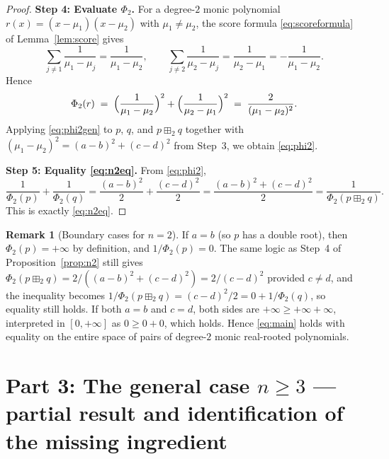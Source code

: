 \documentclass[12pt]{article}
\theoremstyle{definition}
\newtheorem{remark}[theorem]{Remark}
\begin{document}
\begin{proof}
\textbf{Step 4: Evaluate $\Phi_2$.}
For a degree-$2$ monic polynomial $r(x)=(x-\mu_1)(x-\mu_2)$ with $\mu_1\neq\mu_2$, the score formula \eqref{eq:scoreformula} of Lemma~\ref{lem:score} gives
\[
\sum_{j\neq 1}\frac{1}{\mu_1-\mu_j} = \frac{1}{\mu_1-\mu_2},\qquad
\sum_{j\neq 2}\frac{1}{\mu_2-\mu_j} = \frac{1}{\mu_2-\mu_1} = -\frac{1}{\mu_1-\mu_2}.
\]
Hence
\begin{equation}\label{eq:phi2gen}
\Phi_2(r) \;=\; \Bigl(\frac{1}{\mu_1-\mu_2}\Bigr)^2 + \Bigl(\frac{1}{\mu_2-\mu_1}\Bigr)^2 \;=\; \frac{2}{(\mu_1-\mu_2)^2}.
\end{equation}
Applying \eqref{eq:phi2gen} to $p$, $q$, and $p\boxplus_2 q$ together with $(\mu_1-\mu_2)^2=(a-b)^2+(c-d)^2$ from Step~3, we obtain \eqref{eq:phi2}.

\textbf{Step 5: Equality \eqref{eq:n2eq}.}
From \eqref{eq:phi2},
\[
\frac{1}{\Phi_2(p)}+\frac{1}{\Phi_2(q)}
= \frac{(a-b)^2}{2} + \frac{(c-d)^2}{2}
= \frac{(a-b)^2+(c-d)^2}{2}
= \frac{1}{\Phi_2(p\boxplus_2 q)}.
\]
This is exactly \eqref{eq:n2eq}.
\end{proof}

\begin{remark}[Boundary cases for $n=2$]
If $a=b$ (so $p$ has a double root), then $\Phi_2(p)=+\infty$ by definition, and $1/\Phi_2(p)=0$. The same logic as Step~4 of Proposition~\ref{prop:n2} still gives $\Phi_2(p\boxplus_2 q)=2/((a-b)^2+(c-d)^2)=2/(c-d)^2$ provided $c\neq d$, and the inequality becomes $1/\Phi_2(p\boxplus_2 q)=(c-d)^2/2 = 0+1/\Phi_2(q)$, so equality still holds. If both $a=b$ and $c=d$, both sides are $+\infty\geq+\infty+\infty$, interpreted in $[0,+\infty]$ as $0\geq 0+0$, which holds. Hence \eqref{eq:main} holds with equality on the entire space of pairs of degree-$2$ monic real-rooted polynomials.
\end{remark}

\section{Part 3: The general case $n\geq 3$ --- partial result and identification of the missing ingredient}
\end{document}
